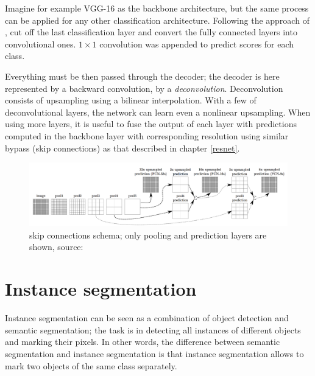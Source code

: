 Imagine for example VGG-16 as the backbone architecture, but the same process 
can be applied for any other classification architecture. Following the approach 
of \cite{fcns}, cut off the last classification layer and convert the fully 
connected layers into convolutional ones. $1 \times 1$ convolution was appended 
to predict scores for each class. 

Everything must be then passed through the decoder; the decoder is here 
represented by a backward convolution, by a \textit{deconvolution}. 
Deconvolution consists of upsampling using a bilinear interpolation. With a few 
of deconvolutional layers, the network can learn even a nonlinear upsampling. 
When using more layers, it is useful to fuse the output of each layer with 
predictions computed in the backbone layer with corresponding resolution using 
similar bypass (skip connections) as that described in chapter \ref{resnet}.

\begin{figure}[H]
   \centering
	\includegraphics[width=\linewidth]{./pictures/fcns-bypass.png}
	\caption[Bypass in Fully convolutional network]{ skip connections 
schema; only pooling and prediction layers are shown, source: \cite{fcns}}
      \label{fig:fcns-bypass}
\end{figure}


\section{Instance segmentation}
\label{instance-segmentation}

Instance segmentation can be seen as a combination of object detection and 
semantic segmentation; the task is in detecting all instances of different 
objects and marking their pixels. In other words, the difference between 
semantic segmentation and instance segmentation is that instance segmentation 
allows to mark two objects of the same class separately.

